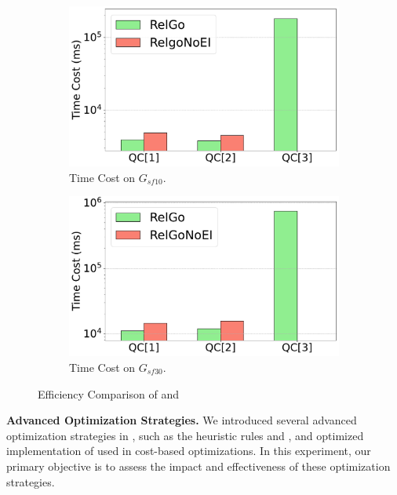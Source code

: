\begin{figure}[ht]
    \centering
    \begin{subfigure}[b]{.45\linewidth}
        \centering
        \includegraphics[width=\linewidth]{./figures/exp/ablation_ei_sf10.pdf}
        \caption{Time Cost on $G_{sf10}$.}
        \label{fig:exp-expand-intersect-sf10}
    \end{subfigure}
    \begin{subfigure}[b]{0.45\linewidth}
        \centering
        \includegraphics[width=\linewidth]{./figures/exp/ablation_ei_sf30.pdf}
        \caption{Time Cost on $G_{sf30}$.}
        \label{fig:exp-expand-intersect-sf30}
    \end{subfigure}
    \caption{Efficiency Comparison of \name and \relgomj}
    \label{fig:exp-expand-intersect}
\end{figure}

\noindent\textbf{Advanced Optimization Strategies.}
We introduced several advanced optimization strategies in \name, such as the heuristic rules \filterrule and \joinfuserule, and optimized implementation of \expandintersectrule used in cost-based optimizations.
In this experiment, our primary objective is to assess the impact and effectiveness of these optimization strategies.

